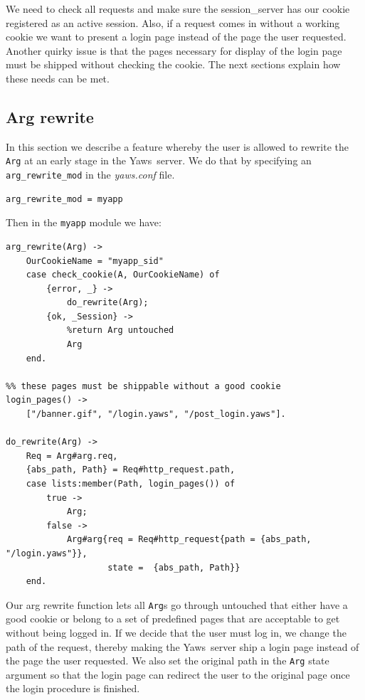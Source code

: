 \documentclass[11pt,oneside,english]{book}
\newcommand{\Yaws}            %
        {{\sc Yaws}}
\begin{document}
We need to check all requests and make sure the session\_server has
our cookie registered as an active session. Also, if a request comes
in without a working cookie we want to present a login page instead of
the page the user requested. Another quirky issue is that the pages
necessary for display of the login page must be shipped without
checking the cookie. The next sections explain how these needs can be
met.

\subsection{Arg rewrite}

In this section we describe a feature whereby the user is allowed to
rewrite the \verb+Arg+ at an early stage in the \Yaws\ server.  We do
that by specifying an \verb+arg_rewrite_mod+ in the \textit{yaws.conf}
file.

\begin{verbatim}
arg_rewrite_mod = myapp
\end{verbatim}


Then in the \verb+myapp+ module we have:

\begin{verbatim}
arg_rewrite(Arg) ->
    OurCookieName = "myapp_sid"
    case check_cookie(A, OurCookieName) of
        {error, _} ->
            do_rewrite(Arg);
        {ok, _Session} ->
            %return Arg untouched
            Arg
    end.

%% these pages must be shippable without a good cookie
login_pages() ->
    ["/banner.gif", "/login.yaws", "/post_login.yaws"].

do_rewrite(Arg) ->
    Req = Arg#arg.req,
    {abs_path, Path} = Req#http_request.path,
    case lists:member(Path, login_pages()) of
        true ->
            Arg;
        false ->
            Arg#arg{req = Req#http_request{path = {abs_path, "/login.yaws"}},
                    state =  {abs_path, Path}}
    end.

\end{verbatim}

Our arg rewrite function lets all \verb+Arg+s go through untouched
that either have a good cookie or belong to a set of predefined pages
that are acceptable to get without being logged in.  If we decide that
the user must log in, we change the path of the request, thereby
making the \Yaws\ server ship a login page instead of the page the
user requested. We also set the original path in the \verb+Arg+ state
argument so that the login page can redirect the user to the original
page once the login procedure is finished.
\end{document}
